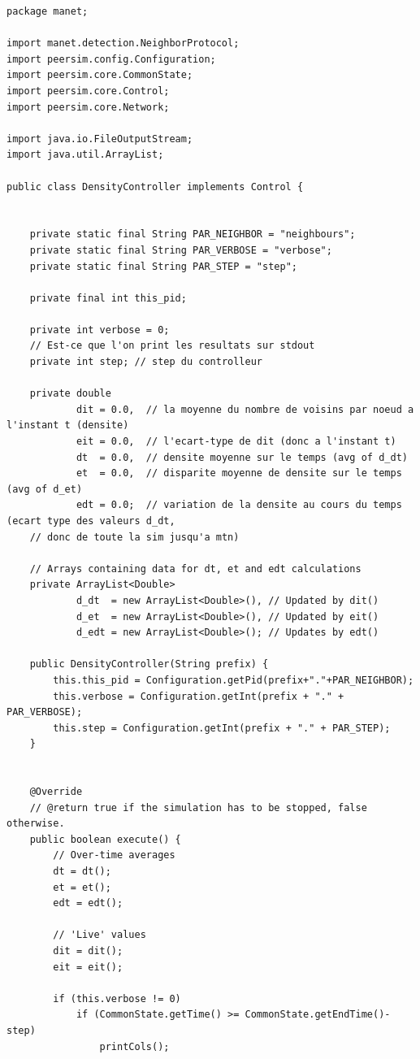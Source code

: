 \documentclass[a4paper]{article}
\begin{document}
\begin{appendix}
\begin{lstlisting}
package manet;

import manet.detection.NeighborProtocol;
import peersim.config.Configuration;
import peersim.core.CommonState;
import peersim.core.Control;
import peersim.core.Network;

import java.io.FileOutputStream;
import java.util.ArrayList;

public class DensityController implements Control {


    private static final String PAR_NEIGHBOR = "neighbours";
    private static final String PAR_VERBOSE = "verbose";
    private static final String PAR_STEP = "step";

    private final int this_pid;

    private int verbose = 0;
    // Est-ce que l'on print les resultats sur stdout
    private int step; // step du controlleur

    private double
            dit = 0.0,  // la moyenne du nombre de voisins par noeud a l'instant t (densite)
            eit = 0.0,  // l'ecart-type de dit (donc a l'instant t)
            dt  = 0.0,  // densite moyenne sur le temps (avg of d_dt)
            et  = 0.0,  // disparite moyenne de densite sur le temps (avg of d_et)
            edt = 0.0;  // variation de la densite au cours du temps (ecart type des valeurs d_dt,
    // donc de toute la sim jusqu'a mtn)

    // Arrays containing data for dt, et and edt calculations
    private ArrayList<Double>
            d_dt  = new ArrayList<Double>(), // Updated by dit()
            d_et  = new ArrayList<Double>(), // Updated by eit()
            d_edt = new ArrayList<Double>(); // Updates by edt()

    public DensityController(String prefix) {
        this.this_pid = Configuration.getPid(prefix+"."+PAR_NEIGHBOR);
        this.verbose = Configuration.getInt(prefix + "." + PAR_VERBOSE);
        this.step = Configuration.getInt(prefix + "." + PAR_STEP);
    }


    @Override
    // @return true if the simulation has to be stopped, false otherwise.
    public boolean execute() {
        // Over-time averages
        dt = dt();
        et = et();
        edt = edt();

        // 'Live' values
        dit = dit();
        eit = eit();

        if (this.verbose != 0)
            if (CommonState.getTime() >= CommonState.getEndTime()-step)
                printCols();


\end{lstlisting}
\end{appendix}
\end{document}
